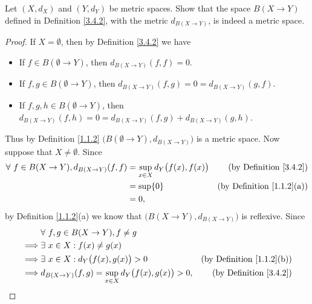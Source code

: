 \exercisesection

\begin{exercise}\label{ex 3.4.1}
    Let \((X, d_X)\) and \((Y, d_Y)\) be metric spaces.
    Show that the space \(B(X \to Y)\) defined in Definition \ref{3.4.2}, with the metric \(d_{B(X \to Y)}\), is indeed a metric space.
\end{exercise}

\begin{proof}
    If \(X = \emptyset\), then by Definition \ref{3.4.2} we have
    \begin{itemize}
        \item If \(f \in B(\emptyset \to Y)\), then \(d_{B(X \to Y)}(f, f) = 0\).
        \item If \(f, g \in B(\emptyset \to Y)\), then \(d_{B(X \to Y)}(f, g) = 0 = d_{B(X \to Y)}(g, f)\).
        \item If \(f, g, h \in B(\emptyset \to Y)\), then \(d_{B(X \to Y)}(f, h) = 0 = d_{B(X \to Y)}(f, g) + d_{B(X \to Y)}(g, h)\).
    \end{itemize}
    Thus by Definition \ref{1.1.2} \(\big(B(\emptyset \to Y), d_{B(X \to Y)}\big)\) is a metric space.
    Now suppose that \(X \neq \emptyset\).
    Since
    \begin{align*}
        \forall\ f \in B(X \to Y), d_{B(X \to Y)}(f, f) & = \sup_{x \in X} d_Y\big(f(x), f(x)\big) & \text{(by Definition \ref{3.4.2})}    \\
                                                        & = \sup \{0\}                             & \text{(by Definition \ref{1.1.2}(a))} \\
                                                        & = 0,
    \end{align*}
    by Definition \ref{1.1.2}(a) we know that \(\big(B(X \to Y), d_{B(X \to Y)}\big)\) is reflexive.
    Since
    \begin{align*}
                 & \forall\ f, g \in B(X \to Y), f \neq g                                                                     \\
        \implies & \exists\ x \in X : f(x) \neq g(x)                                                                          \\
        \implies & \exists\ x \in X : d_Y\big(f(x), g(x)\big) > 0                     & \text{(by Definition \ref{1.1.2}(b))} \\
        \implies & d_{B(X \to Y)}(f, g) = \sup_{x \in X} d_Y\big(f(x), g(x)\big) > 0, & \text{(by Definition \ref{3.4.2})}
    \end{align*}

\end{proof}
